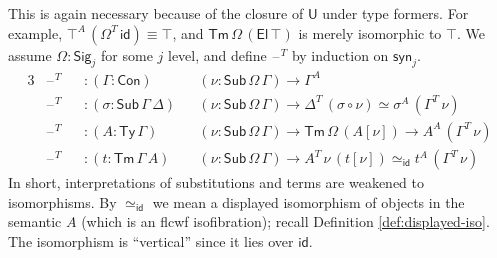 \documentclass[12pt,a4paper,twoside,openany]{book}
\theoremstyle{remark}
\theoremstyle{definition}
\theoremstyle{theorem}
\newcommand{\id}{\mathsf{id}}
\newcommand{\Con}{\mathsf{Con}}
\newcommand{\Sub}{\mathsf{Sub}}
\newcommand{\Tm}{\mathsf{Tm}}
\newcommand{\Ty}{\mathsf{Ty}}
\newcommand{\U}{\mathsf{U}}
\newcommand{\El}{\mathsf{El}}
\newcommand{\blank}{\mathord{\hspace{1pt}\text{--}\hspace{1pt}}}
\newcommand{\Sig}{\mathsf{Sig}}
\newcommand{\syn}{\mathsf{syn}}
\begin{document}
This is again necessary because of the closure of $\U$ under type formers. For
example, $\top^A\,(\Omega^T\,\id) \equiv \top$, and $\Tm\,\Omega\,(\El\,\top)$
is merely isomorphic to $\top$. We assume $\Omega : \Sig_j$ for some $j$
level, and define $\blank^T$ by induction on $\syn_j$.
\begin{alignat*}{3}
  &\blank^T &&: (\Gamma : \Con)&&(\nu : \Sub\,\Omega\,\Gamma) \to \Gamma^A\\
  &\blank^T &&: (\sigma : \Sub\,\Gamma\,\Delta)&&(\nu : \Sub\,\Omega\,\Gamma) \to \Delta^T\,(\sigma \circ \nu) \simeq \sigma^A\,(\Gamma^T\,\nu)\\
  &\blank^T &&: (A : \Ty\,\Gamma)&&(\nu : \Sub\,\Omega\,\Gamma) \to \Tm\,\Omega\,(A[\nu])
  \to A^A\,(\Gamma^T\,\nu)\\
  &\blank^T &&: (t : \Tm\,\Gamma\,A)&&(\nu : \Sub\,\Omega\,\Gamma) \to A^T\,\nu\,(t[\nu]) \simeq_{\id} t^A\,(\Gamma^T\,\nu)
\end{alignat*}
In short, interpretations of substitutions and terms are weakened to
isomorphisms.  By $\simeq_{\id}$ we mean a displayed isomorphism of objects in
the semantic $A$ (which is an flcwf isofibration); recall Definition
\ref{def:displayed-iso}.  The isomorphism is ``vertical'' since it lies over
$\id$.
\end{document}
